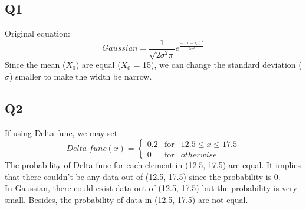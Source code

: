 \documentclass [12pt] {article}
\begin{document}
	\subsection {Q1}
	Original equation:
	\[Gaussian = \frac{1}{\sqrt{2\sigma^2\pi}}e^{\frac{-(x-x_o)^2}{2\sigma^2}}\]
	Since the mean ($X_0$) are equal ($X_0$ = 15), we can change the standard deviation ($\sigma$) smaller to make the width be narrow.
	\subsection {Q2}
	If using Delta func, we may set
	\[Delta \;func(x) = \left\{ \begin{array}{rcl} 0.2 & \mbox{for} & 12.5\leq x\leq17.5 \\
												0 & \mbox{for} & otherwise\end{array} \right.\]
	The probability of Delta func for each element in (12.5, 17.5) are equal. It implies that there couldn't be any data out of (12.5, 17.5) since the probability is 0.\\
	In Gaussian, there could exist data out of (12.5, 17.5) but the probability is very small. Besides, the probability of data in (12.5, 17.5) are not equal.
\end{document}
